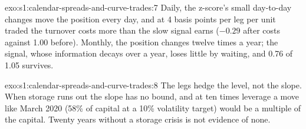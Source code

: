 \begin{solution}{exo:s1:calendar-spreads-and-curve-trades:7}
Daily, the z-score's small day-to-day changes move the position every day, and at 4 basis points per leg per unit traded the turnover costs more than the
slow signal earns ($-0.29$ after costs against 1.00 before). Monthly, the position changes twelve times a year; the signal, whose information decays
over a year, loses little by waiting, and 0.76 of 1.05 survives.
\end{solution}

\begin{solution}{exo:s1:calendar-spreads-and-curve-trades:8}
The legs hedge the level, not the slope. When storage runs out the slope has no bound, and at ten times leverage a move like March 2020 (58\% of capital
at a 10\% volatility target) would be a multiple of the capital. Twenty years without a storage crisis is not evidence of none.
\end{solution}

